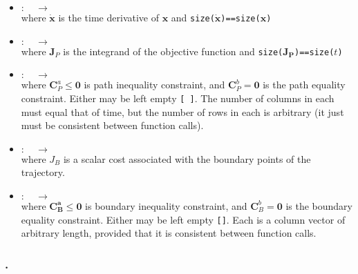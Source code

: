 \begin{itemize} \setlength\itemsep{-0.1em}
\item {}
	${\bm: \quad \to \quad }$
	\\ where $\bm{\dot{x}}$ is the time derivative of $\bm{x}$ and \texttt{size($\bm{\dot{x}}$)==size($\bm{x}$)}
\item {}
	${\bm: \quad \to \quad }$
	\\ where $\bm{J}_P$ is the integrand of the objective function and \texttt{size($\bm{J_P}$)==size($t$)}
\item {}
	${\bm: \quad \to \quad }$
	\tc{$[\bm{C}_P^a, \bm{C}_P^b ]$ = }
	\\ where $\bm{C}_P^a\leq\bm{0}$ is path inequality constraint, and $\bm{C}_P^b = \bm{0}$ is the path equality constraint. Either may be left empty \texttt{[ ]}. 	 	The 	number of columns in each must equal that of time, but the number of rows in each is arbitrary (it just must be consistent between function calls).
\item {}
	${\bm: \quad \to \quad }$
	\\ where $J_B$ is a scalar cost associated with the boundary points of the trajectory.
\item {}
	${\bm: \quad \to \quad }$
	\tc{$[\bm{C}_B^a, \bm{C}_B^b]$ = }
	\\ where $\bm{C_B^a}\leq\bm{0}$ is boundary inequality constraint, and $\bm{C}_B^b = \bm{0}$ is the boundary equality constraint. Either may be left empty \texttt{[]}. Each is a column vector of arbitrary length, provided that it is consistent between function calls.
\end{itemize}


\subsubsection*{.}

